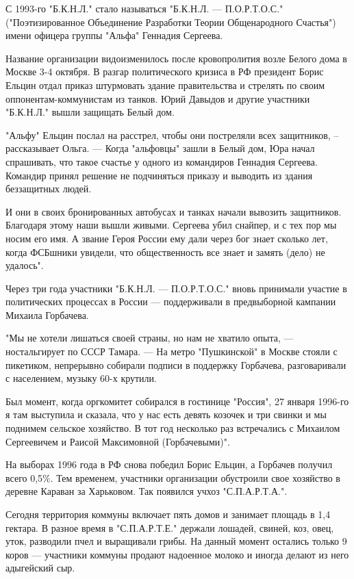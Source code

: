 С 1993-го "Б.К.Н.Л." стало называться "Б.К.Н.Л. --- П.О.Р.Т.О.С."
("Поэтизированное Объединение Разработки Теории Общенародного Счастья") имени
офицера группы "Альфа" Геннадия Сергеева. 

Название организации видоизменилось после кровопролития возле Белого дома в
Москве 3-4 октября. В разгар политического кризиса в РФ президент Борис Ельцин
отдал приказ штурмовать здание правительства и стрелять по своим
оппонентам-коммунистам из танков. Юрий Давыдов и другие участники "Б.К.Н.Л."
вышли защищать Белый дом.

"Альфу" Ельцин послал на расстрел, чтобы они постреляли всех защитников, –
рассказывает Ольга. --- Когда "альфовцы" зашли в Белый дом, Юра начал спрашивать,
что такое счастье у одного из командиров Геннадия Сергеева. Командир принял
решение не подчиняться приказу и выводить из здания беззащитных людей. 

И они в своих бронированных автобусах и танках начали вывозить защитников.
Благодаря этому наши вышли живыми. Сергеева убил снайпер, и с тех пор мы носим
его имя. А звание Героя России ему дали через бог знает сколько лет, когда
ФСБшники увидели, что общественность все знает и замять (дело) не удалось".

Через три года участники "Б.К.Н.Л. --- П.О.Р.Т.О.С." вновь принимали участие в
политических процессах в России --- поддерживали в предвыборной кампании Михаила
Горбачева.

"Мы не хотели лишаться своей страны, но нам не хватило опыта, --- ностальгирует
по СССР Тамара. --- На метро "Пушкинской" в Москве стояли с пикетиком, непрерывно
собирали подписи в поддержку Горбачева, разговаривали с населением, музыку 60-х
крутили. 

Был момент, когда оргкомитет собирался в гостинице "Россия", 27 января 1996-го
я там выступила и сказала, что у нас есть девять козочек и три свинки и мы
поднимем сельское хозяйство. В тот год несколько раз встречались с Михаилом
Сергеевичем и Раисой Максимовной (Горбачевыми)".

На выборах 1996 года в РФ снова победил Борис Ельцин, а Горбачев получил всего
0,5\%. Тем временем, участники организации обустроили свое хозяйство в деревне
Караван за Харьковом. Так появился учхоз "С.П.А.Р.Т.А.".

Сегодня территория коммуны включает пять домов и занимает площадь в 1,4
гектара. В разное время в "С.П.А.Р.Т.Е." держали лошадей, свиней, коз, овец,
уток, разводили пчел и выращивали грибы. На данный момент остались только 9
коров --- участники коммуны продают надоенное молоко и иногда делают из него
адыгейский сыр.

